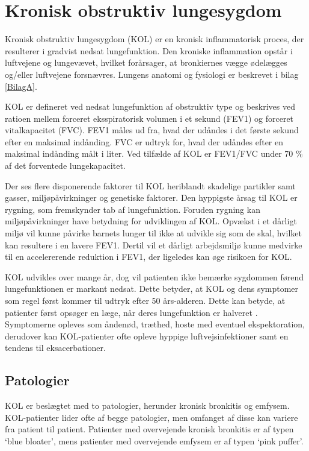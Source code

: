 \section{Kronisk obstruktiv lungesygdom}
Kronisk obstruktiv lungesygdom (KOL) er en kronisk inflammatorisk proces, der resulterer i gradvist nedsat lungefunktion. Den kroniske inflammation opstår i luftvejene og lungevævet, hvilket forårsager, at bronkiernes vægge ødelægges og/eller luftvejene forsnævres.\cite{Basisbogen2016} Lungens anatomi og fysiologi er beskrevet i bilag \ref{BilagA}. 

KOL er defineret ved nedsat lungefunktion af obstruktiv type og beskrives ved ratioen mellem forceret eksspiratorisk volumen i et sekund (FEV1) og forceret vitalkapacitet (FVC). FEV1 måles ud fra, hvad der udåndes i det første sekund efter en maksimal indånding. FVC er udtryk for, hvad der udåndes efter en maksimal indånding målt i liter. Ved tilfælde af KOL er FEV1/FVC under 70 \% af det forventede lungekapacitet. 

Der ses flere disponerende faktorer til KOL heriblandt skadelige partikler samt gasser, miljøpåvirkninger og genetiske faktorer. Den hyppigste årsag til KOL er rygning, som fremskynder tab af lungefunktion.\cite{Basisbogen2016, Martinez2016, dsam2016} Foruden rygning kan miljøpåvirkninger have betydning for udviklingen af KOL. Opvækst i et dårligt miljø vil kunne påvirke barnets lunger til ikke at udvikle sig som de skal, hvilket kan resultere i en lavere FEV1. Dertil vil et dårligt arbejdsmiljø kunne medvirke til en accelererende reduktion i FEV1, der ligeledes kan øge risikoen for KOL. \cite{Martinez2016} 

KOL udvikles over mange år, dog vil patienten ikke bemærke sygdommen førend lungefunktionen er markant nedsat. Dette betyder, at KOL og dens symptomer som regel først kommer til udtryk efter 50 års-alderen\cite{Lange2015}. Dette kan betyde, at patienter først opsøger en læge, når deres lungefunktion er halveret \cite{dsam2016}. Symptomerne opleves som åndenød, træthed, hoste med eventuel ekspektoration, derudover kan KOL-patienter ofte opleve hyppige luftvejsinfektioner samt en tendens til eksacerbationer.\cite{Basisbogen2016}   

\subsection{Patologier}
KOL er beslægtet med to patologier, herunder kronisk bronkitis og emfysem. KOL-patienter lider ofte af begge patologier, men omfanget af disse kan variere fra patient til patient. Patienter med overvejende kronisk bronkitis er af typen ‘blue bloater’, mens patienter med overvejende emfysem er af typen ‘pink puffer'.\cite{Basisbogen2016,Healthguidances2016}

